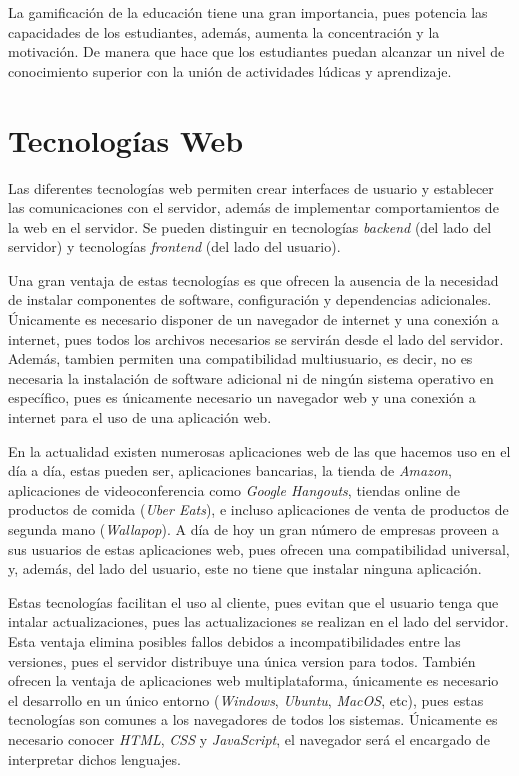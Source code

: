 \documentclass[a4paper, 12pt]{book}
\begin{document}
La gamificación de la educación tiene una gran importancia, pues potencia las capacidades de los estudiantes, además, aumenta la concentración y la motivación. De manera que hace que los estudiantes puedan alcanzar un nivel de conocimiento superior con la unión de actividades lúdicas y aprendizaje.


\section{Tecnologías Web}

Las diferentes tecnologías web permiten crear interfaces de usuario y establecer las comunicaciones con el servidor, además de implementar comportamientos de la web en el servidor. Se pueden distinguir en tecnologías \emph{backend} (del lado del servidor) y tecnologías \emph{frontend} (del lado del usuario).

Una gran ventaja de estas tecnologías es que ofrecen la ausencia de la necesidad de instalar componentes de software, configuración y dependencias adicionales. Únicamente es necesario disponer de un navegador de internet y una conexión a internet, pues todos los archivos necesarios se servirán desde el lado del servidor. Además, tambien permiten una compatibilidad multiusuario, es decir, no es necesaria la instalación de software adicional ni de ningún sistema operativo en específico, pues es únicamente necesario un navegador web y una conexión a internet para el uso de una aplicación web.

En la actualidad existen numerosas aplicaciones web de las que hacemos uso en el día a día, estas pueden ser, aplicaciones bancarias, la tienda de \emph{Amazon}, aplicaciones de videoconferencia como \emph{Google Hangouts}, tiendas online de productos de comida (\emph{Uber Eats}), e incluso aplicaciones de venta de productos de segunda mano (\emph{Wallapop}). A día de hoy un gran número de empresas proveen a sus usuarios de estas aplicaciones web, pues ofrecen una compatibilidad universal, y, además, del lado del usuario, este no tiene que instalar ninguna aplicación. 

Estas tecnologías facilitan el uso al cliente, pues evitan que el usuario tenga que intalar actualizaciones, pues las actualizaciones se realizan en el lado del servidor. Esta ventaja elimina posibles fallos debidos a incompatibilidades entre las versiones, pues el servidor distribuye una única version para todos. También ofrecen la ventaja de aplicaciones web multiplataforma, únicamente es necesario el desarrollo en un único entorno (\emph{Windows}, \emph{Ubuntu}, \emph{MacOS}, etc), pues estas tecnologías son comunes a los navegadores de todos los sistemas. Únicamente es necesario conocer \emph{HTML}, \emph{CSS} y \emph{JavaScript}, el navegador será el encargado de interpretar dichos lenguajes.
\end{document}

